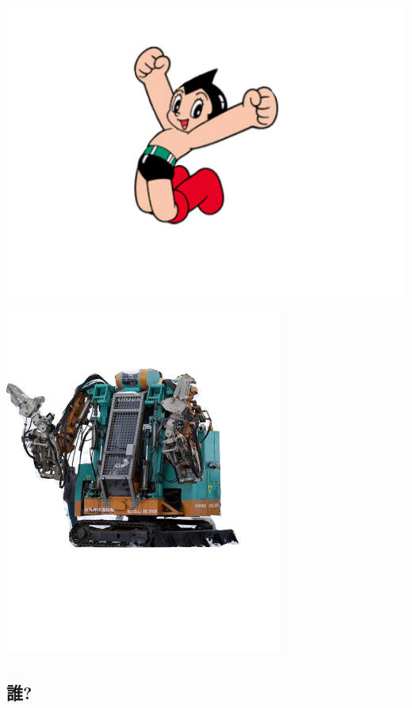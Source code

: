 \begin{container-fluid}
\begin{row-fluid}
\begin{span6}
\includegraphics{img/astro/1.png}
\end{span6}
\begin{span6}
\includegraphics{img/rescue/1.png}
\end{span6}
\end{row-fluid}
\end{container-fluid}

\subsection{誰?}
\label{sec-1-1}

